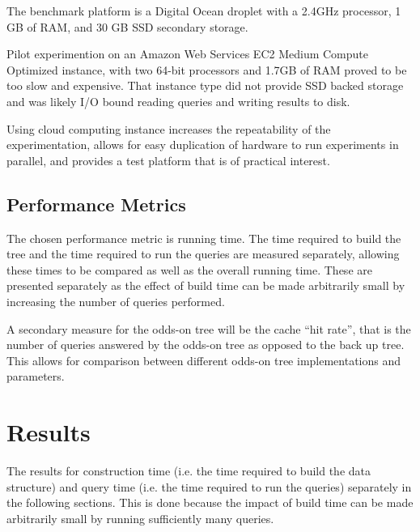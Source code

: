 \documentclass[mcs]{scsthesis}
\begin{document}
The benchmark platform is a Digital Ocean droplet with a 2.4GHz processor, 1 GB
of RAM, and 30 GB SSD secondary storage.

Pilot experimention on an Amazon Web Services EC2 Medium Compute
Optimized instance, with two 64-bit processors and 1.7GB of RAM proved to be
too slow and expensive. That instance type did not provide SSD backed storage
and was likely I/O bound reading queries and writing results to disk.

Using cloud computing instance increases the repeatability of the
experimentation, allows for easy duplication of hardware to run experiments in
parallel, and provides a test platform that is of practical interest. 

\subsection{Performance Metrics}

The chosen performance metric is running time. The time required to build the
tree and the time required to run the queries are measured separately, allowing
these times to be compared as well as the overall running time. These are
presented separately as the effect of build time can be made arbitrarily small
by increasing the number of queries performed.

A secondary measure for the odds-on tree will be the cache ``hit rate'', that
is the number of queries answered by the odds-on tree as opposed to the back
up tree. This allows for comparison between different odds-on tree
implementations and parameters. 



\section{Results}

The results for construction time (i.e. the time required to build the data
structure) and query time (i.e. the time required to run the queries)
separately in the following sections. This is done because the impact of
build time can be made arbitrarily small by running sufficiently many queries.
\end{document}
